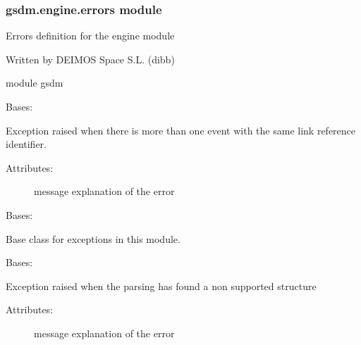 \subsubsection{gsdm.engine.errors module}
\label{\detokenize{gsdm.engine:module-gsdm.engine.errors}}\label{\detokenize{gsdm.engine:gsdm-engine-errors-module}}
Errors definition for the engine module

Written by DEIMOS Space S.L. (dibb)

module gsdm

\begin{fulllineitems}
\label{\detokenize{gsdm.engine:gsdm.engine.errors.DuplicatedEventLinkRef}}
Bases: {\hyperref[\detokenize{gsdm.engine:gsdm.engine.errors.Error}]{}}

Exception raised when there is more than one event with the same link reference identifier.
\begin{description}
\item[{Attributes:}] \leavevmode
message \textendash{} explanation of the error

\end{description}

\end{fulllineitems}


\begin{fulllineitems}
\label{\detokenize{gsdm.engine:gsdm.engine.errors.Error}}
Bases: 

Base class for exceptions in this module.

\end{fulllineitems}


\begin{fulllineitems}
\label{\detokenize{gsdm.engine:gsdm.engine.errors.ErrorParsingDictionary}}
Bases: {\hyperref[\detokenize{gsdm.engine:gsdm.engine.errors.Error}]{}}

Exception raised when the parsing has found a non supported structure
\begin{description}
\item[{Attributes:}] \leavevmode
message \textendash{} explanation of the error

\end{description}

\end{fulllineitems}

